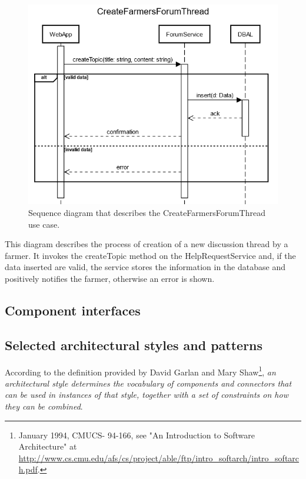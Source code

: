 \documentclass{article}
\begin{document}
\newpage
\begin{figure}[H]
   \centering
   \includegraphics[scale=0.40]{diagrams/sequence diagrams/CreateFarmersForumThread.png}
    \caption{Sequence diagram that describes the CreateFarmersForumThread use case.}
\end{figure}
This diagram describes the process of creation of a new discussion thread by a farmer. It invokes the createTopic method on the HelpRequestService and, if the data inserted are valid, the service stores the information in the database and positively notifies the farmer, otherwise an error is shown.
\newpage
\subsection{Component interfaces}\label{Component interfaces}
\subsection{Selected architectural styles and patterns}
According to the definition provided by David Garlan and Mary Shaw\footnote{January 1994, CMUCS-
94-166, see "An Introduction to Software Architecture"
at \url{http://www.cs.cmu.edu/afs/cs/project/able/ftp/intro_softarch/intro_softarch.pdf}.}, \textit{an architectural style determines the vocabulary of components and connectors that can be used in instances of that style, together with a set of constraints on how they can be combined}.\\
\end{document}
